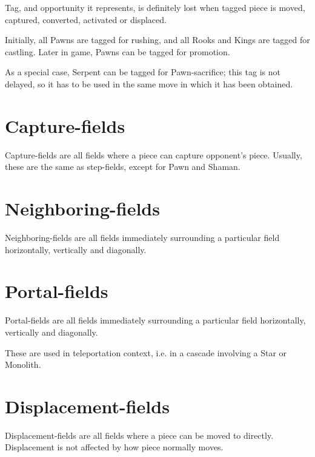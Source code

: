 Tag, and opportunity it represents, is definitely lost when tagged piece is moved, captured, converted, activated or displaced.

Initially, all Pawns are tagged for rushing, and all Rooks and Kings are tagged for castling.
Later in game, Pawns can be tagged for promotion.

As a special case, Serpent can be tagged for Pawn-sacrifice; this tag is not delayed, so it has to be used in the same move in which it has been obtained.

\section*{Capture-fields}
\label{sec:Terms/Capture-fields}
Capture-fields are all fields where a piece can capture opponent's piece.
Usually, these are the same as step-fields, except for Pawn and Shaman.

\section*{Neighboring-fields}
\label{sec:Terms/Neighboring-fields}
Neighboring-fields are all fields immediately surrounding a particular field horizontally,
vertically and diagonally.


\section*{Portal-fields}
\label{sec:Terms/Portal-fields}
Portal-fields are all fields immediately surrounding a particular field horizontally,
vertically and diagonally.

These are used in teleportation context, i.e. in a cascade involving a Star or Monolith.

\section*{Displacement-fields}
\label{sec:Terms/Displacement-fields}
Displacement-fields are all fields where a piece can be moved to directly.
Displacement is not affected by how piece normally moves.

